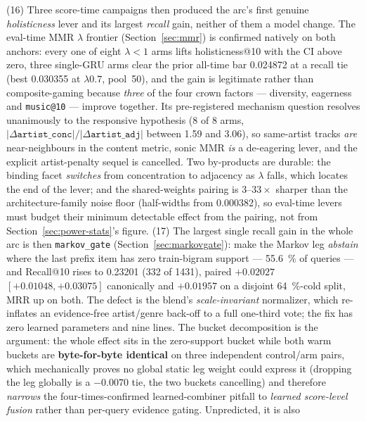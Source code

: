 \documentclass[11pt]{article}
\begin{document}
(16) Three score-time campaigns then produced the arc's first genuine
\emph{holisticness} lever and its largest \emph{recall} gain, neither of them a
model change. The eval-time MMR $\lambda$ frontier (Section~\ref{sec:mmr}) is
confirmed natively on both anchors: every one of eight $\lambda<1$ arms lifts
holisticness@10 with the CI above zero, three single-GRU arms clear the prior
all-time bar \num{0.024872} at a recall tie (best \num{0.030355} at
$\lambda\num{0.7}$, pool~\num{50}), and the gain is legitimate rather than
composite-gaming because \emph{three} of the four crown factors --- diversity,
eagerness and \texttt{music@10} --- improve together. Its pre-registered mechanism
question resolves unanimously to the responsive hypothesis (8 of 8 arms,
$|\Delta\texttt{artist\_conc}|/|\Delta\texttt{artist\_adj}|$ between \num{1.59} and
\num{3.06}), so same-artist tracks \emph{are} near-neighbours in the content
metric, sonic MMR \emph{is} a de-eagering lever, and the explicit artist-penalty
sequel is cancelled. Two by-products are durable: the binding facet
\emph{switches} from concentration to adjacency as $\lambda$ falls, which locates
the end of the lever; and the shared-weights pairing is $\numrange{3}{33}\times$
sharper than the architecture-family noise floor (half-widths from
\num{0.000382}), so eval-time levers must budget their minimum detectable effect
from the pairing, not from Section~\ref{sec:power-stats}'s figure.
(17) The largest single recall gain in the whole arc is then \texttt{markov\_gate}
(Section~\ref{sec:markovgate}): make the Markov leg \emph{abstain} where the last
prefix item has zero train-bigram support --- \SI{55.6}{\percent} of queries --- and
Recall@10 rises to \num{0.23201} (\num{332} of \num{1431}), paired
$+\num{0.02027}$ $[+\num{0.01048}, +\num{0.03075}]$ canonically and
$+\num{0.01957}$ on a disjoint \SI{64}{\percent}-cold split, MRR up on both. The
defect is the blend's \emph{scale-invariant} normalizer, which re-inflates an
evidence-free artist/genre back-off to a full one-third vote; the fix has zero
learned parameters and nine lines. The bucket decomposition is the argument: the
whole effect sits in the zero-support bucket while both warm buckets are
\textbf{byte-for-byte identical} on three independent control/arm pairs, which
mechanically proves no global static leg weight could express it (dropping the leg
globally is a $-\num{0.0070}$ tie, the two buckets cancelling) and therefore
\emph{narrows} the four-times-confirmed learned-combiner pitfall to \emph{learned
score-level fusion} rather than per-query evidence gating. Unpredicted, it is also
\end{document}
